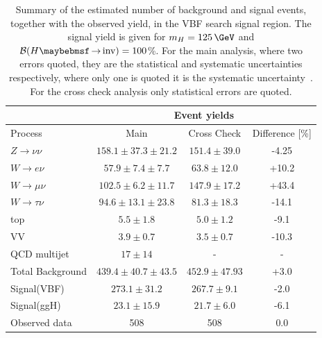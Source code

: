 \begin{table}[!htb]
\centering
\begin{tabular}{|l|c|c|c|}
\hline 
        & \multicolumn{3}{c|}{Event yields} \\
\hline
Process               & Main                      & Cross Check       & Difference [\%] \\
\hline\hline
$Z\rightarrow\nu\nu$  & $158.1 \pm 37.3 \pm 21.2$ & $151.4 \pm 39.0$  &           -4.25 \\
$W\rightarrow e\nu$   & $ 57.9 \pm 7.4  \pm  7.7$ &  $63.8 \pm 12.0$  &           +10.2 \\
$W\rightarrow\mu\nu$  & $102.5 \pm 6.2  \pm 11.7$ & $147.9 \pm 17.2$  &           +43.4 \\
$W\rightarrow\tau\nu$ & $ 94.6 \pm 13.1 \pm 23.8$ &  $81.3 \pm 18.3$  &           -14.1 \\
top                   & $  5.5 \pm 1.8$           &   $5.0 \pm 1.2$   &            -9.1 \\ 
VV                    & $  3.9 \pm 0.7$           &   $3.5 \pm 0.7$   &           -10.3 \\  
QCD multijet          & $   17 \pm 14$            &                -  &               - \\
\hline\hline                                                     
Total Background      & $439.4 \pm 40.7 \pm 43.5$ &   $452.9\pm47.93$ &            +3.0 \\
\hline\hline                                                     
Signal(VBF)           & $273.1 \pm 31.2 $         &   $267.7 \pm 9.1$ &            -2.0 \\
Signal(ggH)           & $ 23.1 \pm 15.9 $         &   $ 21.7 \pm 6.0$ &            -6.1 \\
\hline\hline                                                     
Observed data         & 508                       &               508 &             0.0 \\
\hline
\end{tabular}
\caption[Summary of the estimated number of background and signal events, together with the observed yield, in the \gls{VBF} search signal region.]
{Summary of the estimated number of background and signal events, together with the observed yield, in the \gls{VBF} search signal region. The signal yield is given for $m_H=125\,\GeV$ and $\BRinv=100$\%. For the main analysis, where two errors quoted, they are the statistical and systematic uncertainties respectively, where only one is quoted it is the systematic uncertainty~\cite{ARTICLE:CMSVBFHiggsInvisibleParkedAnalysisPAS}. For the cross check analysis only statistical errors are quoted.}
\label{TABLE:ParkedDataAnalysis_Results_Summary}
\end{table}

